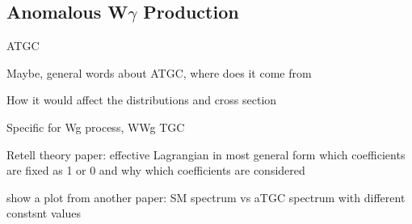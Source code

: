 \subsection{Anomalous W$\gamma$ Production}
\label{sec:WgAbout_ATGC}

ATGC

Maybe, general words about ATGC, where does it come from

How it would affect the distributions and cross section

Specific for Wg process, WWg TGC

Retell theory paper:
effective Lagrangian in most general form
which coefficients are fixed as 1 or 0 and why
which coefficients are considered

show a plot from another paper: SM spectrum vs aTGC spectrum with different constsnt values
